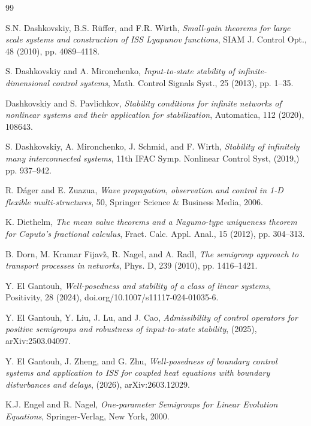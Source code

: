 \documentclass[onecolumn]{autart}
\numberwithin{equation}{section}
\begin{document}
\begin{thebibliography}{99}
		
		S.N. Dashkovskiy, B.S. R\"{u}ffer, and F.R. Wirth, \emph{Small-gain theorems for large scale systems and construction of ISS Lyapunov functions}, SIAM J. Control Opt., 48 (2010), pp. 4089--4118.
		
		S. Dashkovskiy and A. Mironchenko, \emph{Input-to-state stability of infinite-dimensional control systems}, Math. Control Signals Syst., 25 (2013), pp. 1--35.
		
		Dashkovskiy and S. Pavlichkov, \emph{Stability conditions for infinite networks of nonlinear systems and their application for stabilization}, Automatica, 112 (2020), 108643.
		
		S. Dashkovskiy, A. Mironchenko, J. Schmid, and F. Wirth, \emph{Stability of infinitely many interconnected systems}, 11th IFAC Symp. Nonlinear Control Syst, (2019,) pp. 937--942.
		
		R. D\'{a}ger and E. Zuazua, \emph{Wave propagation, observation and control in 1-D flexible multi-structures}, 50, Springer Science $ \& $ Business Media, 2006.
		
		K. Diethelm, \emph{The mean value theorems and a Nagumo-type uniqueness theorem for Caputo's fractional calculus}, Fract. Calc. Appl. Anal., 15 (2012), pp. 304--313.
		
		
		B. Dorn, M. Kramar Fijav\~{z}, R. Nagel, and A. Radl, \emph{The semigroup approach to transport processes in networks}, Phys. D, 239 (2010), pp. 1416--1421.

	Y. El Gantouh, \emph{Well-posedness and stability of a class of linear systems}, Positivity, 28 (2024), doi.org/10.1007/s11117-024-01035-6.
		
		Y. El Gantouh, Y. Liu, J. Lu, and J. Cao, \emph{Admissibility of control operators for positive semigroups and robustness of input-to-state stability}, (2025), arXiv:2503.04097.

	Y. El Gantouh, J. Zheng, and G. Zhu, \emph{Well-posedness of boundary control systems and application to ISS for coupled heat equations with boundary disturbances and delays}, (2026), arXiv:2603.12029.
		
		K.J. Engel and R. Nagel, \emph{One-parameter Semigroups for Linear Evolution Equations}, Springer-Verlag, New York, 2000.
		

\end{thebibliography}
\end{document}
